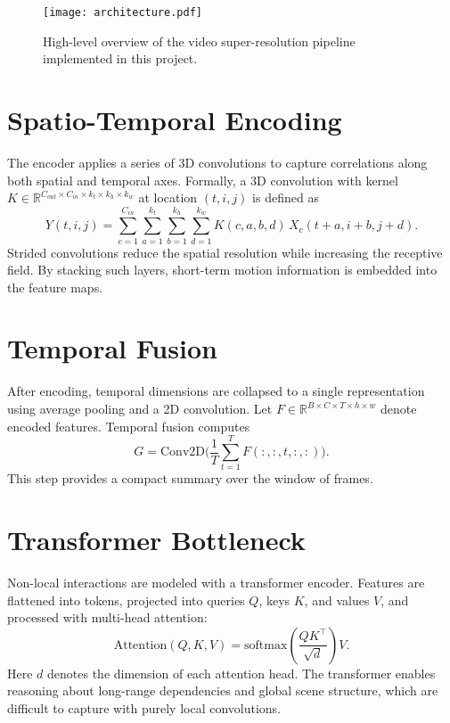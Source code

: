 \documentclass{article}
\begin{document}
\begin{figure}[h]
\centering
\texttt{[image: architecture.pdf]}
\caption{High-level overview of the video super-resolution pipeline implemented in this project.}
\label{fig:architecture}
\end{figure}

\section{Spatio-Temporal Encoding}
The encoder applies a series of 3D convolutions to capture correlations along both spatial and temporal axes. Formally, a 3D convolution with kernel $K \in \mathbb{R}^{C_{out}\times C_{in}\times k_t\times k_h\times k_w}$ at location $(t,i,j)$ is defined as
\begin{equation}
Y(t,i,j) = \sum_{c=1}^{C_{in}} \sum_{a=1}^{k_t} \sum_{b=1}^{k_h} \sum_{d=1}^{k_w} K(c,a,b,d) \, X_{c}(t+a,i+b,j+d).
\end{equation}
Strided convolutions reduce the spatial resolution while increasing the receptive field. By stacking such layers, short-term motion information is embedded into the feature maps.

\section{Temporal Fusion}
After encoding, temporal dimensions are collapsed to a single representation using average pooling and a 2D convolution. Let $F \in \mathbb{R}^{B\times C\times T\times h\times w}$ denote encoded features. Temporal fusion computes
\begin{equation}
G = \mathrm{Conv2D}\big(\frac{1}{T} \sum_{t=1}^{T} F(:, :, t, :, :)\big).
\end{equation}
This step provides a compact summary over the window of frames.

\section{Transformer Bottleneck}
Non-local interactions are modeled with a transformer encoder. Features are flattened into tokens, projected into queries $Q$, keys $K$, and values $V$, and processed with multi-head attention:
\begin{equation}
\mathrm{Attention}(Q,K,V) = \mathrm{softmax}\left(\frac{QK^{\top}}{\sqrt{d}}\right)V.
\end{equation}
Here $d$ denotes the dimension of each attention head. The transformer enables reasoning about long-range dependencies and global scene structure, which are difficult to capture with purely local convolutions.
\end{document}
